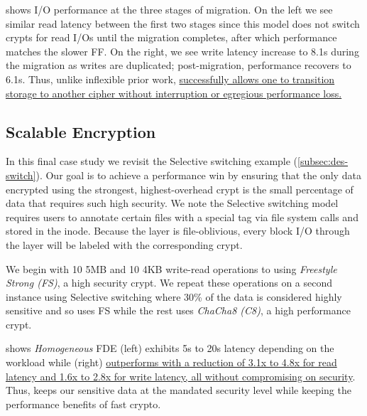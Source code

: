 

 shows I/O performance at the three stages of
migration. On the left we see similar read latency between the first two stages
since this model does not switch crypts for read I/Os until the migration
completes, after which performance matches the slower FF. On the right, we see
write latency increase to 8.1s during the migration as writes are duplicated;
post-migration, performance recovers to 6.1s. Thus, unlike inflexible prior
work, \sys \uline{successfully allows one to transition storage to another
cipher without interruption or egregious performance loss.}


\subsection{Scalable Encryption}\label{subsec:usecase-scalable}

In this final case study we revisit the Selective switching example
(\cref{subsec:des-switch}). Our goal is to achieve a performance win by ensuring
that the only data encrypted using the strongest, highest-overhead crypt is the
small percentage of data that requires such high security. We note the Selective
switching model requires users to annotate certain files with a special tag via
file system calls and stored in the inode. Because the \sys layer is
file-oblivious, every block I/O through the \sys layer will be labeled with the
corresponding crypt.

We begin with 10 5MB and 10 4KB write-read operations to \sys using {\em
Freestyle Strong (FS)}, a high security crypt. We repeat these operations on a
second instance using Selective switching where 30\% of the data is considered
highly sensitive and so uses FS while the rest uses {\em ChaCha8 (C8)}, a high
performance crypt.



 shows {\em Homogeneous} FDE (left) exhibits 5s to
20s latency depending on the workload while \sys (right) \uline{outperforms with
a reduction of 3.1x to 4.8x for read latency and 1.6x to 2.8x for write latency,
all without compromising on security}. Thus, \sys keeps our sensitive data at
the mandated security level while keeping the performance benefits of fast
crypto.
